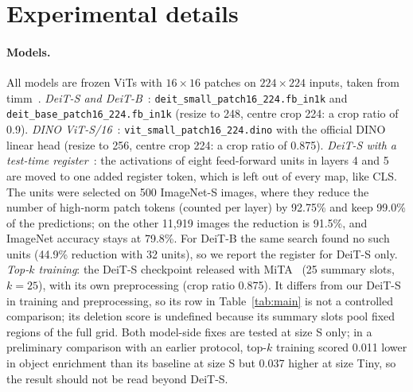 
\captionsetup{skip=5pt}
\raggedbottom

\section{Experimental details}
\label{app:setup}

\paragraph{Models.} All models are frozen ViTs with $16{\times}16$ patches on $224{\times}224$ inputs, taken from timm~\citep{wightman2019}. \emph{DeiT-S and DeiT-B}~\citep{touvron2021}: \texttt{deit\_small\_patch16\_224.fb\_in1k} and \texttt{deit\_base\_patch16\_224.fb\_in1k} (resize to 248, centre crop 224: a crop ratio of 0.9). \emph{DINO ViT-S/16}~\citep{caron2021}: \texttt{vit\_small\_patch16\_224.dino} with the official DINO linear head (resize to 256, centre crop 224: a crop ratio of 0.875). \emph{DeiT-S with a test-time register}~\citep{jiang2025}: the activations of eight feed-forward units in layers 4 and 5 are moved to one added register token, which is left out of every map, like CLS. The units were selected on 500 ImageNet-S images, where they reduce the number of high-norm patch tokens (counted per layer) by 92.75\% and keep 99.0\% of the predictions; on the other 11,919 images the reduction is 91.5\%, and ImageNet accuracy stays at 79.8\%. For DeiT-B the same search found no such units (44.9\% reduction with 32 units), so we report the register for DeiT-S only. \emph{Top-$k$ training}: the DeiT-S checkpoint released with MiTA~\citep{wen2026mita} (25 summary slots, $k=25$), with its own preprocessing (crop ratio 0.875). It differs from our DeiT-S in training and preprocessing, so its row in Table~\ref{tab:main} is not a controlled comparison; its deletion score is undefined because its summary slots pool fixed regions of the full grid. Both model-side fixes are tested at size S only; in a preliminary comparison with an earlier protocol, top-$k$ training scored 0.011 lower in object enrichment than its baseline at size S but 0.037 higher at size Tiny, so the result should not be read beyond DeiT-S.

